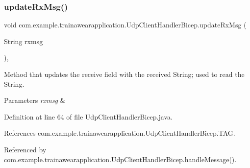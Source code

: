 \mbox{\label{classcom_1_1example_1_1trainawearapplication_1_1_udp_client_handler_bicep_a1f7d4b7fa7229fe47c39dff0b6dec3a2}} 
\subsubsection{\texorpdfstring{updateRxMsg()}{updateRxMsg()}}
{\footnotesize\ttfamily void com.\+example.\+trainawearapplication.\+Udp\+Client\+Handler\+Bicep.\+update\+Rx\+Msg (\begin{DoxyParamCaption}\item[{String}]{rxmsg }\end{DoxyParamCaption})\hspace{0.3cm}{\ttfamily [inline]}, {\ttfamily [private]}}



Method that updates the receive field with the received String; used to read the String. 


\begin{DoxyParams}{Parameters}
{\em rxmsg} & \\
\hline
\end{DoxyParams}


Definition at line 64 of file Udp\+Client\+Handler\+Bicep.\+java.


\begin{DoxyCode}{0}

\end{DoxyCode}


References com.\+example.\+trainawearapplication.\+Udp\+Client\+Handler\+Bicep.\+T\+AG.



Referenced by com.\+example.\+trainawearapplication.\+Udp\+Client\+Handler\+Bicep.\+handle\+Message().

